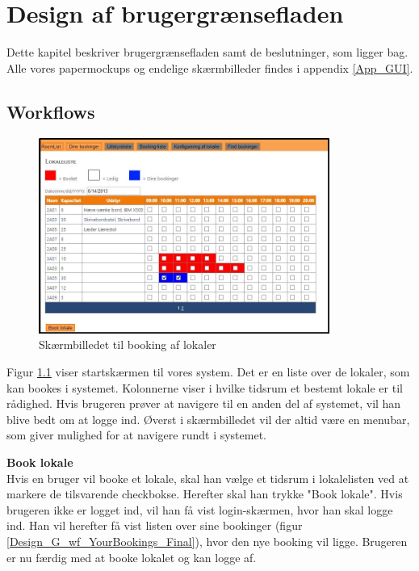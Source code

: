 \chapter{Design af brugergrænsefladen}
\label{Design_G}
Dette kapitel beskriver brugergrænsefladen samt de beslutninger, som ligger bag. Alle vores papermockups og endelige skærmbilleder findes i appendix \ref{App_GUI}.

\section{Workflows}
\label{Design_G_wf}
\label{Design_G_Development}
\begin{figure}[h!]
  \centering
    \includegraphics[width=0.85\textwidth]{Appendix/GUI-Prototype/DigitalMockup/GridEksempel}
  \caption{Skærmbilledet til booking af lokaler}
\label{Design_G_wf_FinalGrid}
\end{figure}

Figur \ref{Design_G_wf_FinalGrid} viser startskærmen til vores system. Det er en liste over de lokaler, som kan bookes i systemet. Kolonnerne viser i hvilke tidsrum et bestemt lokale er til rådighed. Hvis brugeren prøver at navigere til en anden del af systemet, vil han blive bedt om at logge ind. Øverst i skærmbilledet vil der altid være en menubar, som giver mulighed for at navigere rundt i systemet.

\textbf{Book lokale}
\\Hvis en bruger vil booke et lokale, skal han vælge et tidsrum i lokalelisten ved at markere de tilsvarende checkbokse. Herefter skal han trykke "Book lokale". Hvis brugeren ikke er logget ind, vil han få vist login-skærmen, hvor han skal logge ind. Han vil herefter få vist listen over sine bookinger (figur \ref{Design_G_wf_YourBookings_Final}), hvor den nye booking vil ligge. Brugeren er nu færdig med at booke lokalet og kan logge af. 

